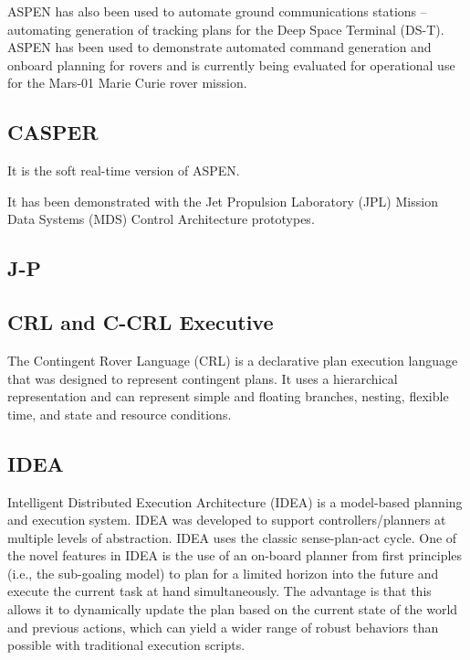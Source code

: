 \documentclass[conference]{IEEEtran}
\begin{document}
 ASPEN has also been used to automate ground communications stations – automating generation of tracking plans for the Deep Space Terminal (DS-T). ASPEN has been used to demonstrate automated command generation and onboard planning for rovers and is currently being evaluated for operational use for the Mars-01 Marie Curie rover mission. 


\subsection{\textbf{CASPER}}\label{sec:casper}
 It is the soft real-time version of ASPEN.

 It has been demonstrated with the Jet Propulsion Laboratory (JPL) Mission Data Systems (MDS) Control Architecture prototypes.

\subsection{\textbf{J-P}}\label{sec:j-p}

\subsection{\textbf{CRL and C-CRL Executive}}\label{sec:crl}
The Contingent Rover Language (CRL) is a declarative plan execution language that was designed to represent contingent plans. It uses a hierarchical representation and can represent simple and floating branches, nesting, flexible time, and state and resource conditions. 



\subsection{\textbf{IDEA}}\label{sec:idea}
Intelligent Distributed Execution Architecture (IDEA) is a model-based planning and execution system. IDEA was developed to support controllers/planners at multiple levels of abstraction. IDEA uses the classic sense-plan-act cycle. One of the novel features in IDEA is the use of an on-board planner from first principles (i.e., the sub-goaling model) to plan for a limited horizon into the future and execute the current task at hand simultaneously. The advantage is that this allows it to dynamically update the plan based on the current state of the world and previous actions, which can yield a wider range of robust behaviors than possible with traditional execution scripts.
\end{document}
